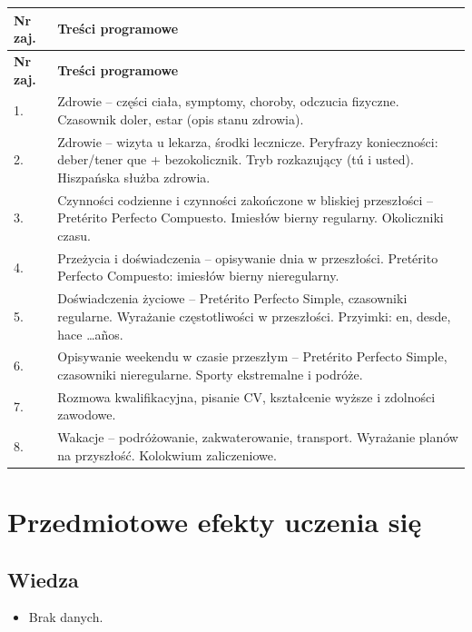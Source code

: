 \documentclass[12pt, a4paper]{article}
\newcommand{\thdrule}{\noalign{\global\setlength{\extrarowheight}{0pt}}}
\newcommand{\thdend}{\noalign{\global\setlength{\extrarowheight}{3pt}}}
\begin{document}
{\scriptsize
\begin{longtable}{m{1.5cm}m{14.5cm}}
\thdrule\toprule
\rowcolor{pjatkRed} {\color{white}\textbf{Nr zaj.}} & {\color{white}\textbf{Treści programowe}} \\
\midrule\thdend
\endfirsthead
\thdrule\toprule
\rowcolor{pjatkRed} {\color{white}\textbf{Nr zaj.}} & {\color{white}\textbf{Treści programowe}} \\
\midrule\thdend
\endhead
  \rowcolor{tableRowLight} 1. & Zdrowie – części ciała, symptomy, choroby, odczucia fizyczne. Czasownik doler, estar (opis stanu zdrowia). \\
  \rowcolor{tableRowAlt} 2. & Zdrowie – wizyta u lekarza, środki lecznicze. Peryfrazy konieczności: deber/tener que + bezokolicznik. Tryb rozkazujący (tú i usted). Hiszpańska służba zdrowia. \\
  \rowcolor{tableRowLight} 3. & Czynności codzienne i czynności zakończone w bliskiej przeszłości – Pretérito Perfecto Compuesto. Imiesłów bierny regularny. Okoliczniki czasu. \\
  \rowcolor{tableRowAlt} 4. & Przeżycia i doświadczenia – opisywanie dnia w przeszłości. Pretérito Perfecto Compuesto: imiesłów bierny nieregularny. \\
  \rowcolor{tableRowLight} 5. & Doświadczenia życiowe – Pretérito Perfecto Simple, czasowniki regularne. Wyrażanie częstotliwości w przeszłości. Przyimki: en, desde, hace …años. \\
  \rowcolor{tableRowAlt} 6. & Opisywanie weekendu w czasie przeszłym – Pretérito Perfecto Simple, czasowniki nieregularne. Sporty ekstremalne i podróże. \\
  \rowcolor{tableRowLight} 7. & Rozmowa kwalifikacyjna, pisanie CV, kształcenie wyższe i zdolności zawodowe. \\
  \rowcolor{tableRowAlt} 8. & Wakacje – podróżowanie, zakwaterowanie, transport. Wyrażanie planów na przyszłość. Kolokwium zaliczeniowe. \\
\bottomrule
\end{longtable}}

\section{Przedmiotowe efekty uczenia się}

\subsection*{Wiedza}
\begin{itemize}
  \item Brak danych.
\end{itemize}
\end{document}
